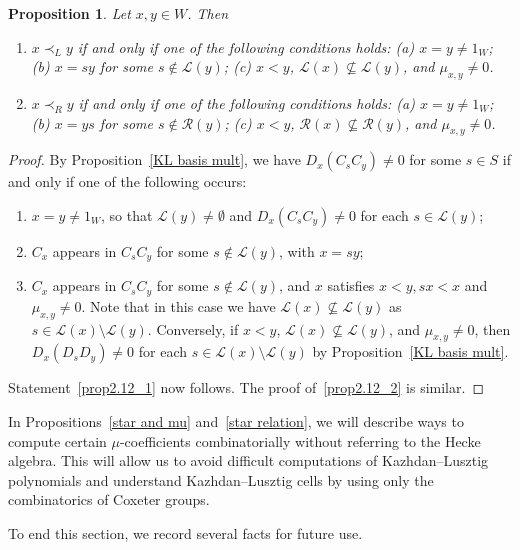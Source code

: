 \documentclass[10pt]{article}
\newtheorem{prop}[theorem]{Proposition}
\theoremstyle{definition}
\newcommand{\se}{\subseteq}
\begin{document}
\begin{prop}
 \label{alternative prec}
 Let $x,y\in W$. Then
 \begin{enumerate}
 \item\label{prop2.12_1} $x\prec_L y$ if and only if one of the following conditions holds:
 \textup{(}a\textup{)} $x=y\neq 1_W$;
 \textup{(}b\textup{)} $x=sy$ for some $s\notin
 \mathcal{L}(y)$; \textup{(}c\textup{)} $x<y$, $\mathcal{L}(x)\not\se \mathcal{L}(y)$, and
 $\mu_{x,y}\neq 0$.
 \item\label{prop2.12_2} $x\prec_R y$ if and only if one of the following conditions holds:
 \textup{(}a\textup{)} $x=y\neq 1_W$;
 \textup{(}b\textup{)} $x=ys$ for some $s\notin
 \mathcal{R}(y)$; \textup{(}c\textup{)} $x<y$, $\mathcal{R}(x)\not\se \mathcal{R}(y)$, and
 $\mu_{x,y}\neq 0$.
 \end{enumerate}
\end{prop}
\begin{proof}
 By Proposition~\ref{KL basis mult}, we have $D_x(C_sC_y)\neq 0$ for some $s\in S$ if and only if one of the following occurs:
 \begin{enumerate}[(\alph*)]
 \item %
 $x=y\neq 1_W$, so that $\mathcal{L}(y)\neq \emptyset$ and $D_x(C_sC_y)\neq 0$ for each $s\in
 \mathcal{L}(y)$;
 \item %
 $C_x$ appears in $C_sC_y$ for some $s\not\in \mathcal{L}(y)$, with $x=sy$;
 \item %
 $C_x$ appears in $C_sC_y$ for some $s\not\in \mathcal{L}(y)$, and $x$
 satisfies $x<y, sx<x$ and $\mu_{x,y}\neq 0$. Note that in this case
 we have $\mathcal{L}(x)\not\se\mathcal{L}(y)$ as $s\in
 \mathcal{L}(x)\setminus \mathcal{L}(y)$. Conversely, 
 if $x<y$, $\mathcal{L}(x)\not\se\mathcal{L}(y)$, and $\mu_{x,y}\neq 0$,
 then 
 $D_x(D_sD_y)\neq 0$ for each $s\in \mathcal{L}(x)\setminus
 \mathcal{L}(y)$ by Proposition~\ref{KL basis mult}.
 \end{enumerate}
 Statement~\eqref{prop2.12_1} now follows. The proof of~\eqref{prop2.12_2}
 is similar.
\end{proof}

In Propositions~\ref{star and mu} and~\ref{star relation}, we will describe
ways to compute certain
$\mu$-coefficients combinatorially without referring to the Hecke algebra.
This will allow us to avoid difficult computations of Kazhdan--Lusztig
polynomials and understand Kazhdan--Lusztig cells by using only the combinatorics of
Coxeter groups.

To end this section, we record several facts for future use.
\end{document}
